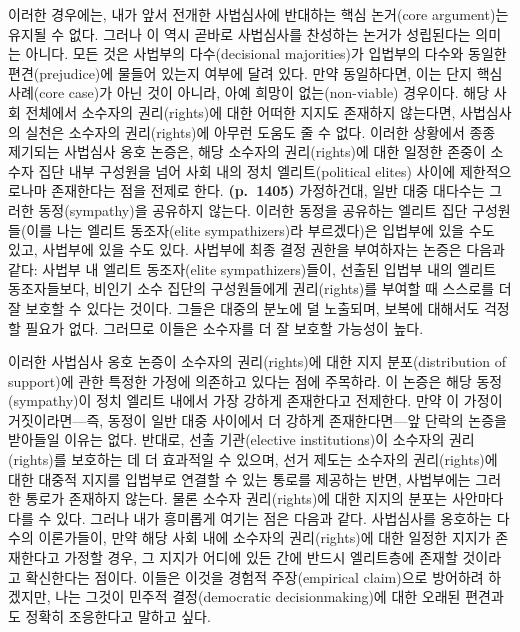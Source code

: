 \documentclass[a4paper,12pt,oneside]{article}  %
\begin{document}
이러한 경우에는, 내가 앞서 전개한 사법심사에 반대하는 핵심 논거(core
argument)는 유지될 수 없다. 그러나 이 역시 곧바로 사법심사를 찬성하는
논거가 성립된다는 의미는 아니다. 모든 것은 사법부의 다수(decisional
majorities)가 입법부의 다수와 동일한 편견(prejudice)에 물들어 있는지
여부에 달려 있다. 만약 동일하다면, 이는 단지 핵심 사례(core case)가 아닌
것이 아니라, 아예 희망이 없는(non-viable) 경우이다. 해당 사회 전체에서
소수자의 권리(rights)에 대한 어떠한 지지도 존재하지 않는다면, 사법심사의
실천은 소수자의 권리(rights)에 아무런 도움도 줄 수 없다. 이러한 상황에서
종종 제기되는 사법심사 옹호 논증은, 해당 소수자의 권리(rights)에 대한
일정한 존중이 소수자 집단 내부 구성원을 넘어 사회 내의 정치
엘리트(political elites) 사이에 제한적으로나마 존재한다는 점을 전제로
한다. \textbf{(p.~1405)} 가정하건대, 일반 대중 대다수는 그러한
동정(sympathy)을 공유하지 않는다. 이러한 동정을 공유하는 엘리트 집단
구성원들(이를 나는 엘리트 동조자(elite sympathizers)라 부르겠다)은
입법부에 있을 수도 있고, 사법부에 있을 수도 있다. 사법부에 최종 결정
권한을 부여하자는 논증은 다음과 같다: 사법부 내 엘리트 동조자(elite
sympathizers)들이, 선출된 입법부 내의 엘리트 동조자들보다, 비인기 소수
집단의 구성원들에게 권리(rights)를 부여할 때 스스로를 더 잘 보호할 수
있다는 것이다. 그들은 대중의 분노에 덜 노출되며, 보복에 대해서도 걱정할
필요가 없다. 그러므로 이들은 소수자를 더 잘 보호할 가능성이 높다.

이러한 사법심사 옹호 논증이 소수자의 권리(rights)에 대한 지지
분포(distribution of support)에 관한 특정한 가정에 의존하고 있다는 점에
주목하라. 이 논증은 해당 동정(sympathy)이 정치 엘리트 내에서 가장 강하게
존재한다고 전제한다. 만약 이 가정이 거짓이라면---즉, 동정이 일반 대중
사이에서 더 강하게 존재한다면---앞 단락의 논증을 받아들일 이유는 없다.
반대로, 선출 기관(elective institutions)이 소수자의 권리(rights)를
보호하는 데 더 효과적일 수 있으며, 선거 제도는 소수자의 권리(rights)에
대한 대중적 지지를 입법부로 연결할 수 있는 통로를 제공하는 반면,
사법부에는 그러한 통로가 존재하지 않는다. 물론 소수자 권리(rights)에
대한 지지의 분포는 사안마다 다를 수 있다. 그러나 내가 흥미롭게 여기는
점은 다음과 같다. 사법심사를 옹호하는 다수의 이론가들이, 만약 해당 사회
내에 소수자의 권리(rights)에 대한 일정한 지지가 존재한다고 가정할 경우,
그 지지가 어디에 있든 간에 반드시 엘리트층에 존재할 것이라고 확신한다는
점이다. 이들은 이것을 경험적 주장(empirical claim)으로 방어하려
하겠지만, 나는 그것이 민주적 결정(democratic decisionmaking)에 대한
오래된 편견과도 정확히 조응한다고 말하고 싶다.
\end{document}
